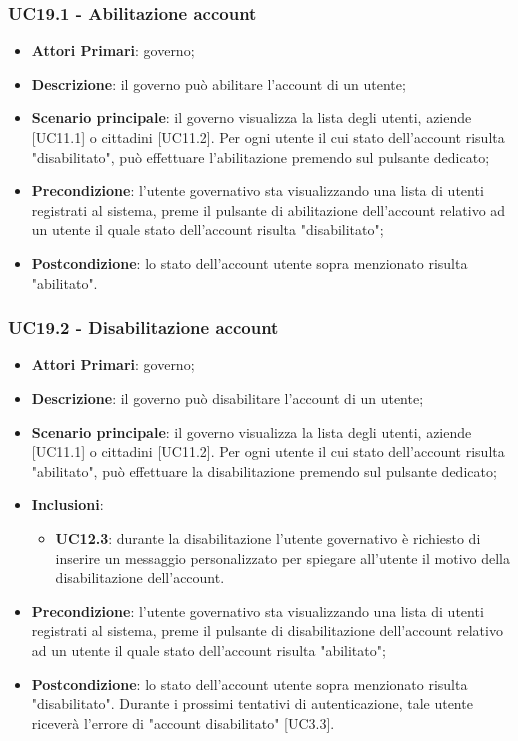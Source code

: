 \subsubsection{UC19.1 - Abilitazione account}
\begin{itemize}
	\item \textbf{Attori Primari}:
	governo;
	\item \textbf{Descrizione}: il governo può abilitare l'account di un utente;
	\item \textbf{Scenario principale}: il governo visualizza la lista degli utenti, aziende [UC11.1] o cittadini [UC11.2]. Per ogni utente il cui stato dell'account risulta "disabilitato", può effettuare l'abilitazione premendo sul pulsante dedicato;

	\item \textbf{Precondizione}: l'utente governativo sta visualizzando una lista di utenti registrati al sistema, preme il pulsante di abilitazione dell'account relativo ad un utente il quale stato dell'account risulta "disabilitato";
	\item \textbf{Postcondizione}: lo stato  dell'account utente sopra menzionato risulta "abilitato".
\end{itemize} 


\subsubsection{UC19.2 - Disabilitazione account}
\begin{itemize}
	\item \textbf{Attori Primari}:
	governo;
	\item \textbf{Descrizione}: il governo può disabilitare l'account di un utente;
	\item \textbf{Scenario principale}: il governo visualizza la lista degli utenti, aziende [UC11.1] o cittadini [UC11.2]. Per ogni utente il cui stato dell'account risulta "abilitato", può effettuare la disabilitazione premendo sul pulsante dedicato;
	\item \textbf{Inclusioni}: 
	\begin{itemize}
		\item \textbf{UC12.3}: durante la disabilitazione l'utente governativo è richiesto di inserire un messaggio personalizzato per spiegare all'utente il motivo della disabilitazione dell'account.
	\end{itemize}
	\item \textbf{Precondizione}: l'utente governativo sta visualizzando una lista di utenti registrati al sistema, preme il pulsante di disabilitazione dell'account relativo ad un utente il quale stato dell'account risulta "abilitato";
	\item \textbf{Postcondizione}: lo stato  dell'account utente sopra menzionato risulta "disabilitato". Durante i prossimi tentativi di autenticazione, tale utente riceverà l'errore di "account disabilitato" [UC3.3].
\end{itemize} 

